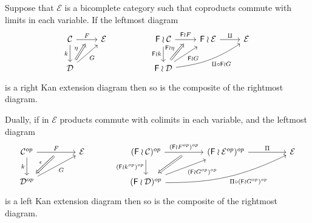\documentclass[a4paper,10pt]{article}%
\begin{document}
\begin{lemma}\label{FINWREATPRODLIM LEM}
  Suppose that $\mathcal{E}$ is a bicomplete category such that 
  coproducts commute with limits in each variable. If the leftmost diagram
  \begin{equation}\label{WRRAN EQ}
    \begin{tikzcd}
      \mathcal{C} \ar{r}[swap,name=F]{}{F} \ar{d}[swap]{k} &
      \mathcal{E} & 
      & 
      \Fin \wr \mathcal{C} \ar{r}[swap,name=FF]{}{\Fin \wr F} \ar{d}[swap]{\Fin \wr k}&
      \Fin \wr \mathcal{E} \ar{r}{\amalg} &
      \mathcal{E}
      \\
      |[alias=D]|\mathcal{D} \ar{ru}[swap]{G} &
      & & 
      |[alias=FD]|\Fin \wr \mathcal{D} \ar{ru}[swap]{\Fin \wr G}
      \ar[bend right=13]{rru}[swap]{\amalg \circ \Fin \wr G}
      \arrow[Rightarrow, from=D, to=F,shorten <=0.10cm,"\eta"]
      \arrow[Rightarrow, from=FD, to=FF,shorten <=0.10cm,"\Fin \wr \eta"]
    \end{tikzcd}
  \end{equation}
  is a right Kan extension diagram then so is the composite of the rightmost diagram. 

  Dually, if in $\mathcal{E}$ products commute with colimits in each variable, and the leftmost diagram
  \begin{equation}\label{WRLAN EQ}
    \begin{tikzcd}[column sep = 4.5em]
      \mathcal{C}^{op} \ar{r}[swap,name=F]{}{F} \ar{d}[swap]{k} & 
      \mathcal{E} & 
      (\Fin \wr \mathcal{C})^{op} \ar{d}[swap]{(\Fin \wr k^{op})^{op}} 
      \ar{r}[swap,name=FF]{}{(\Fin \wr F^{op})^{op}} & 
      (\Fin \wr \mathcal{E}^{op})^{op} \ar{r}{\Pi} &
      \mathcal{E}
      \\
      |[alias=D]|\mathcal{D}^{op} \ar{ru}[swap]{G} &
      & 
      |[alias=FD]|(\Fin \wr \mathcal{D})^{op} 
      \ar{ru}[swap]{(\Fin \wr G^{op})^{op}}
      \ar[bend right=13]{rru}[swap]{\Pi \circ (\Fin \wr G^{op})^{op}}
      &
      \arrow[Leftarrow, from=D, to=F,shorten <=0.10cm,"\epsilon"]
      \arrow[Leftarrow, from=FD, to=FF,shorten <=0.10cm]
    \end{tikzcd}
  \end{equation}
  is a left Kan extension diagram then so is the composite of the rightmost diagram. 
\end{lemma}
\end{document}
